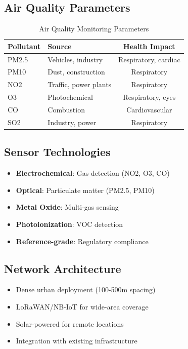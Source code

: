 \documentclass[12pt,a4paper]{article}
\begin{document}
\subsection{Air Quality Parameters}

\begin{table}[H]
\centering
\caption{Air Quality Monitoring Parameters}
\begin{tabular}{llc}
\toprule
\textbf{Pollutant} & \textbf{Source} & \textbf{Health Impact} \\
\midrule
PM2.5 & Vehicles, industry & Respiratory, cardiac \\
PM10 & Dust, construction & Respiratory \\
NO2 & Traffic, power plants & Respiratory \\
O3 & Photochemical & Respiratory, eyes \\
CO & Combustion & Cardiovascular \\
SO2 & Industry, power & Respiratory \\
\bottomrule
\end{tabular}
\end{table}

\subsection{Sensor Technologies}

\begin{tcolorbox}[colback=airblue!10, colframe=airblue, title=Air Quality Sensor Types]
\begin{itemize}
    \item \textbf{Electrochemical}: Gas detection (NO2, O3, CO)
    \item \textbf{Optical}: Particulate matter (PM2.5, PM10)
    \item \textbf{Metal Oxide}: Multi-gas sensing
    \item \textbf{Photoionization}: VOC detection
    \item \textbf{Reference-grade}: Regulatory compliance
\end{itemize}
\end{tcolorbox}

\subsection{Network Architecture}

\begin{itemize}
    \item Dense urban deployment (100-500m spacing)
    \item LoRaWAN/NB-IoT for wide-area coverage
    \item Solar-powered for remote locations
    \item Integration with existing infrastructure
\end{itemize}
\end{document}
